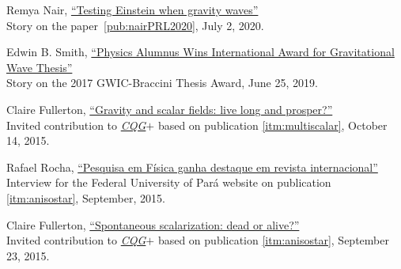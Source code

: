 \documentclass[11pt]{article}
\begin{document}
\begin{etaremune}[]
    \item Remya Nair, \href{https://physics.illinois.edu/research-highlights/article/36886}{``Testing Einstein when gravity waves''} \\
    Story on the paper~\ref{pub:nairPRL2020},
    July 2, 2020.

    \item Edwin B. Smith, \href{https://news.olemiss.edu/physics-alumnus-wins-international-award-gravitational-wave-thesis/}{``Physics Alumnus Wins International Award for Gravitational Wave Thesis''} \\
        Story on the 2017 GWIC-Braccini Thesis Award,
        June 25, 2019.

    \item Claire Fullerton, \href{http://cqgplus.com/2015/10/14/gravity-and-scalar-fields-live-long-and-prosper/}{``Gravity and scalar fields: live long and prosper?''} \\
        Invited contribution to \href{http://cqgplus.com}{\emph{CQG$+$}} based on publication \ref{itm:multiscalar},
        October 14, 2015.

    \item Rafael Rocha, \href{http://www.portal.ufpa.br/imprensa/noticia.php?cod=10864}{``Pesquisa em F\'isica ganha destaque em revista internacional''} \\
        Interview for the Federal University of Par\'a website on publication
        \ref{itm:anisostar},
        September, 2015.

    \item Claire Fullerton, \href{http://cqgplus.com/2015/09/23/spontaneous-scalarization-dead-or-alive/}{``Spontaneous scalarization: dead or alive?''} \\
        Invited contribution to \href{http://cqgplus.com}{\emph{CQG$+$}} based on publication \ref{itm:anisostar},
        September 23, 2015.
\end{etaremune}
\end{document}

